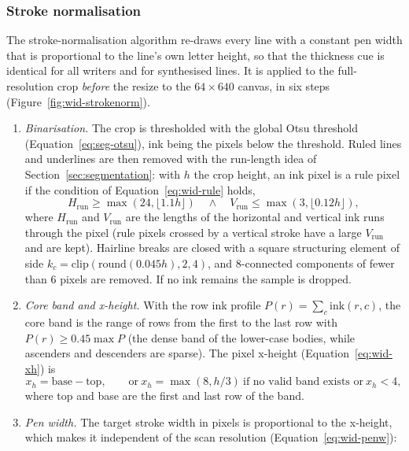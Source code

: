 \subsubsection{Stroke normalisation}
\label{sec:wid-strokenorm}

The stroke-normalisation algorithm re-draws every line with a constant pen width that is proportional to the line's own letter height, so that the thickness cue is identical for all writers and for synthesised lines.
It is applied to the full-resolution crop \emph{before} the resize to the $64\times640$ canvas, in six steps (Figure~\ref{fig:wid-strokenorm}).


\begin{enumerate}
\item \emph{Binarisation.} The crop is thresholded with the global Otsu threshold (Equation~\ref{eq:seg-otsu}), ink being the pixels below the threshold. Ruled lines and underlines are then removed with the run-length idea of Section~\ref{sec:segmentation}: with $h$ the crop height, an ink pixel is a rule pixel if the condition of Equation~\ref{eq:wid-rule} holds,
\begin{equation}
H_{\mathrm{run}}\ge\max(24,\lfloor1.1h\rfloor)\quad\wedge\quad V_{\mathrm{run}}\le\max(3,\lfloor0.12h\rfloor),
\label{eq:wid-rule}
\end{equation}
where $H_{\mathrm{run}}$ and $V_{\mathrm{run}}$ are the lengths of the horizontal and vertical ink runs through the pixel (rule pixels crossed by a vertical stroke have a large $V_{\mathrm{run}}$ and are kept). Hairline breaks are closed with a square structuring element of side $k_c=\mathrm{clip}(\mathrm{round}(0.045h),2,4)$, and 8-connected components of fewer than 6 pixels are removed. If no ink remains the sample is dropped.
\item \emph{Core band and x-height.} With the row ink profile $P(r)=\sum_c\mathrm{ink}(r,c)$, the core band is the range of rows from the first to the last row with $P(r)\ge0.45\max P$ (the dense band of the lower-case bodies, while ascenders and descenders are sparse). The pixel x-height (Equation~\ref{eq:wid-xh}) is
\begin{equation}
x_h=\text{base}-\text{top},\qquad\text{or}\ x_h=\max(8,h/3)\ \text{if no valid band exists or}\ x_h<4,
\label{eq:wid-xh}
\end{equation}
where top and base are the first and last row of the band.
\item \emph{Pen width.} The target stroke width in pixels is proportional to the x-height, which makes it independent of the scan resolution (Equation~\ref{eq:wid-penw}):

\end{enumerate}
